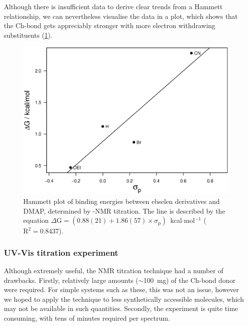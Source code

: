 \begin{refsection}
Although there is insufficient data to derive clear trends from a Hammett relationship, we can nevertheless visualise the data in a plot, which shows that the Ch-bond gets appreciably stronger with more electron withdrawing substituents (\cref{fig:hammett-dmap-nmr}).

\begin{figure}
    \centering
    \includegraphics[width=0.9\linewidth]{Figures/hammett-nmr-para.eps}
    \caption[Hammett plot of binding energies between ebselen derivatives and DMAP.]{Hammett plot of binding energies between ebselen derivatives and DMAP, determined by -NMR titration. The line is described by the equation $\Delta\mathrm{G} = (0.88(21) + 1.86(57) \times \sigma_\text{p})$~kcal$ \cdot $mol$^{-1}$ ($\mathrm{R}^2 = 0.8437$).}\label{fig:hammett-dmap-nmr}
\end{figure}


\subsubsection{UV-Vis titration experiment}
Although extremely useful, the NMR titration technique had a number of drawbacks.
Firstly, relatively large amounts ($\sim$100~mg) of the Ch-bond donor were required.
For simple systems such as these, this was not an issue, however we hoped to apply the technique to less synthetically accessible molecules, which may not be available in such quantities.
Secondly, the experiment is quite time consuming, with tens of minutes required per spectrum.


\end{refsection}
